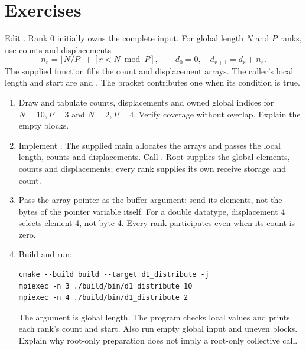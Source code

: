 \section{Exercises}
Edit . Rank 0 initially owns the complete input.
For global length $N$ and $P$ ranks, use counts and displacements
\[n_r=\lfloor N/P\rfloor+[r<N\bmod P],\qquad d_0=0,\quad d_{r+1}=d_r+n_r.\]
The supplied  function fills the count and displacement arrays.
The caller's local length and start are  and . The bracket contributes one when its condition is true.
\begin{enumerate}
\item Draw and tabulate counts, displacements and owned global indices for
$N=10,P=3$ and $N=2,P=4$. Verify coverage without overlap. Explain the empty blocks.
\item Implement . The supplied main allocates the arrays and
passes the local length, counts and displacements. Call . Root supplies the global elements, counts and displacements;
every rank supplies its own receive storage and count.
\item Pass the array pointer as the buffer argument: send its elements, not the
bytes of the pointer variable itself. For a double datatype, displacement 4 selects element
4, not byte 4. Every rank participates even when its count is zero.
\item Build and run:
\begin{lstlisting}[style=shell]
cmake --build build --target d1_distribute -j
mpiexec -n 3 ./build/bin/d1_distribute 10
mpiexec -n 4 ./build/bin/d1_distribute 2
\end{lstlisting}
The argument is global length. The program checks local values and prints each
rank's count and start. Also run empty global input and uneven blocks.
Explain why root-only preparation does not imply a root-only collective call.
\end{enumerate}

